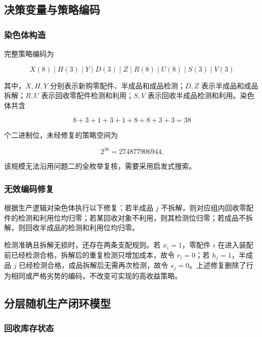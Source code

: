 \documentclass{cumcm}
\numberwithin{figure}{section}
\numberwithin{table}{section}
\begin{document}
\subsection{决策变量与策略编码}\label{ux51b3ux7b56ux53d8ux91cfux4e0eux7b56ux7565ux7f16ux7801}

\subsubsection{染色体构造}\label{ux67d3ux8272ux4f53ux6784ux9020}

完整策略编码为

\[
X(8)\mid H(3)\mid Y\mid D(3)\mid Z
\mid R(8)\mid U(8)\mid S(3)\mid V(3)
\]

其中，\(X,H,Y\) 分别表示新购零配件、半成品和成品检测；\(D,Z\) 表示半成品和成品拆解；\(R,U\) 表示回收零配件检测和利用；\(S,V\) 表示回收半成品检测和利用。染色体共含

\[
8+3+1+3+1+8+8+3+3=38
\]

个二进制位，未经修复的策略空间为

\[
2^{38}=274877906944.
\]

该规模无法沿用问题二的全枚举复核，需要采用启发式搜索。

\subsubsection{无效编码修复}\label{ux65e0ux6548ux7f16ux7801ux4feeux590d}

根据生产逻辑对染色体执行以下修复：若半成品 \(j\) 不拆解，则对应组内回收零配件的检测和利用位均归零；若某回收对象不利用，则其检测位归零；若成品不拆解，则回收半成品的检测和利用位均归零。

检测准确且拆解无损时，还存在两条支配规则。若 \(x_i=1\)，零配件 \(i\) 在进入装配前已经检测合格，拆解后的重复检测只增加成本，故令 \(r_i=0\)；若 \(h_j=1\)，半成品 \(j\) 已经检测合格，成品拆解后无需再次检测，故令 \(s_j=0\)。上述修复删除了行为相同或严格劣势的编码，不改变可实现的高收益策略。

\subsection{分层随机生产闭环模型}\label{ux5206ux5c42ux968fux673aux751fux4ea7ux95edux73afux6a21ux578b}

\subsubsection{回收库存状态}\label{ux56deux6536ux5e93ux5b58ux72b6ux6001}
\end{document}

